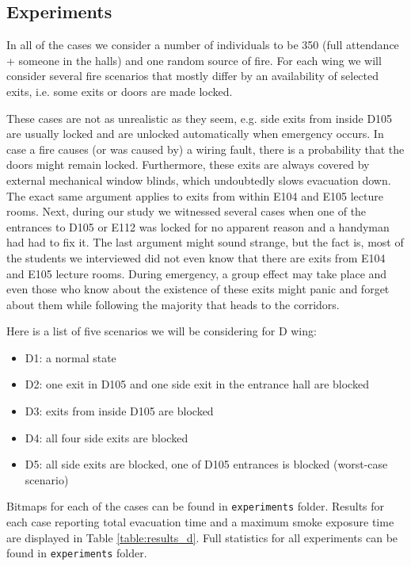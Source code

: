 \subsection{Experiments}
In all of the cases we consider a number of individuals to be 350 (full
attendance + someone in the halls) and one random source of fire. For each wing
we will consider several fire scenarios that mostly differ by an availability
of selected exits, i.e. some exits or doors are made locked.

These cases are not as unrealistic as they seem, e.g. side exits from inside
D105 are usually locked and are unlocked automatically when emergency occurs.
In case a fire causes (or was caused by) a wiring fault, there is a probability
that the doors might remain locked.
Furthermore, these exits are always covered by external mechanical window blinds,
which undoubtedly slows evacuation down.
The exact same argument applies to exits from within E104 and E105 lecture
rooms.
Next, during our study we witnessed several cases when one of the entrances
to D105 or E112 was locked for no apparent reason and a handyman had had to fix
it.
The last argument might sound strange, but the fact is, most of the students we
interviewed did not even know that there are exits from E104 and E105 lecture
rooms.
During emergency, a group effect may take place and even those who know about
the existence of these exits might panic and forget about them while following
the majority that heads to the corridors.

Here is a list of five scenarios we will be considering for D wing:

\begin{itemize}
    \item D1: a normal state
    \item D2: one exit in D105 and one side exit in the entrance hall are
    blocked
    \item D3: exits from inside D105 are blocked
    \item D4: all four side exits are blocked
    \item D5: all side exits are blocked, one of D105 entrances is blocked
    (worst-case scenario)
\end{itemize}

Bitmaps for each of the cases can be found in \texttt{experiments} folder.
Results for each case reporting total evacuation time and a maximum smoke
exposure time are displayed in Table \ref{table:results_d}.
Full statistics for all experiments can be found in \texttt{experiments}
folder.

